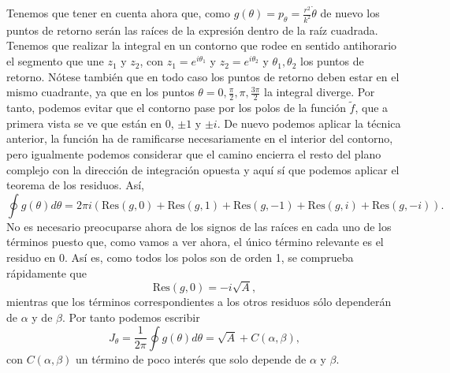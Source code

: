\documentclass[12pt,a4paper,twoside]{article}
\theoremstyle{definition} \newtheorem{defn}[thm]{Definición}
\theoremstyle{definition} \newtheorem{ejemplo}[thm]{Ejemplo}
\theoremstyle{definition} \newtheorem{ejercicio}[thm]{Ejercicio}
\theoremstyle{remark} \newtheorem*{obs}{Observación}
\begin{document}
Tenemos que tener en cuenta ahora que, como $g(\theta)=p_{\theta}=\frac{r^2}{k^2}\dot{\theta}$ de nuevo los puntos de retorno serán las raíces de la expresión dentro de la raíz cuadrada. Tenemos que realizar la integral en un contorno que rodee en sentido antihorario el segmento que une $z_1$ y $z_2$, con $z_1=e^{i\theta_1}$ y $z_2=e^{i\theta_2}$ y $\theta_1, \theta_2$ los puntos de retorno. Nótese también que en todo caso los puntos de retorno deben estar en el mismo cuadrante, ya que en los puntos $\theta=0,\frac{\pi}{2},\pi, \frac{3\pi}{2}$ la integral diverge. Por tanto, podemos evitar que el contorno pase por los polos de la función $\tilde{f}$, que a primera vista se ve que están en $0$, $\pm 1$ y $\pm i$. De nuevo podemos aplicar la técnica anterior, la función ha de ramificarse necesariamente en el interior del contorno, pero igualmente podemos considerar que el camino encierra el resto del plano complejo con la dirección de integración opuesta y aquí sí que podemos aplicar el teorema de los residuos. Así,
\begin{equation}
  \oint g(\theta)d\theta = 2\pi i (\mathrm{Res}(g,0) +\mathrm{Res}(g,1)+\mathrm{Res}(g,-1)+\mathrm{Res}(g,i)+\mathrm{Res}(g,-i)).
\end{equation}
No es necesario preocuparse ahora de los signos de las raíces en cada uno de los términos puesto que, como vamos a ver ahora, el único término relevante es el residuo en $0$.
Así es, como todos los polos son de orden 1, se comprueba rápidamente que 
\begin{equation}
  \mathrm{Res}(g,0)=-i\sqrt{A},
\end{equation}
mientras que los términos correspondientes a los otros residuos sólo dependerán de $\alpha$ y de $\beta$. Por tanto podemos escribir
\begin{equation}
  J_{\theta}=\frac{1}{2\pi}\oint g(\theta)d\theta=\sqrt{A}+C(\alpha,\beta), 
\end{equation}
con $C(\alpha,\beta)$ un término de poco interés que solo depende de $\alpha$ y $\beta$.

\nocite{*}


\end{document}
